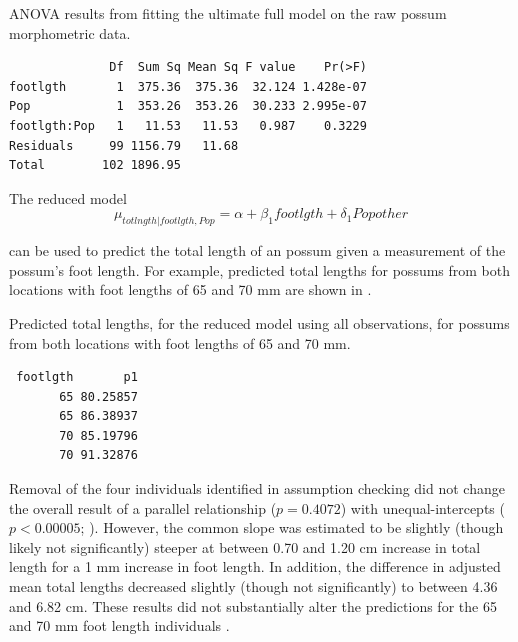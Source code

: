 \documentclass[10pt,openany]{book}\usepackage[]{graphicx}\usepackage[]{color}
\makeatletter
\newenvironment{kframe}{%
 \def\at@end@of@kframe{}%
 \ifinner\ifhmode%
  \def\at@end@of@kframe{\end{minipage}}%
  \begin{minipage}{\columnwidth}%
 \fi\fi%
 \def\FrameCommand##1{\hskip\@totalleftmargin \hskip-\fboxsep
 \colorbox{shadecolor}{##1}\hskip-\fboxsep
     \hskip-\linewidth \hskip-\@totalleftmargin \hskip\columnwidth}%
 \MakeFramed {\advance\hsize-\width
   \@totalleftmargin\z@ \linewidth\hsize
   \@setminipage}}%
 {\par\unskip\endMakeFramed%
 \at@end@of@kframe}
\newenvironment{knitrout}{}{} %
\makeatother
\begin{document}
\begin{table}[h]
  \centering
  \caption{ANOVA results from fitting the ultimate full model on the raw possum morphometric data.}\label{tab:IVROpTest1}
\begin{knitrout}
\color{fgcolor}\begin{kframe}
\begin{verbatim}
              Df  Sum Sq Mean Sq F value    Pr(>F)
footlgth       1  375.36  375.36  32.124 1.428e-07
Pop            1  353.26  353.26  30.233 2.995e-07
footlgth:Pop   1   11.53   11.53   0.987    0.3229
Residuals     99 1156.79   11.68                  
Total        102 1896.95                          
\end{verbatim}
\end{kframe}
\end{knitrout}
\end{table}

The reduced model
\[ \mu_{totlngth|footlgth,Pop} = \alpha + \beta_{1}footlgth + \delta_{1}Popother  \]

can be used to predict the total length of an possum given a measurement of the possum's foot length.  For example, predicted total lengths for possums from both locations with foot lengths of 65 and 70 mm are shown in .

\begin{table}[h]
  \centering
  \caption{Predicted total lengths, for the reduced model using all observations, for possums from both locations with foot lengths of 65 and 70 mm.}\label{tab:IVROpPreds1}
\begin{knitrout}
\color{fgcolor}\begin{kframe}
\begin{verbatim}
 footlgth       p1
       65 80.25857
       65 86.38937
       70 85.19796
       70 91.32876
\end{verbatim}
\end{kframe}
\end{knitrout}
\end{table}



Removal of the four individuals identified in assumption checking did not change the overall result of a parallel relationship ($p=0.4072$) with unequal-intercepts ($p<0.00005$; ).  However, the common slope was estimated to be slightly (though likely not significantly) steeper at between 0.70 and 1.20 cm increase in total length for a 1 mm increase in foot length.  In addition, the difference in adjusted mean total lengths decreased slightly (though not significantly) to between 4.36 and 6.82 cm.  These results did not substantially alter the predictions for the 65 and 70 mm foot length individuals .
\end{document}
